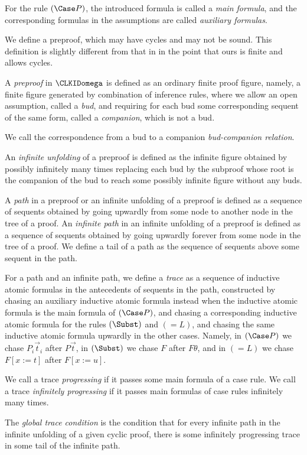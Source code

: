 For the rule $(\Case P)$,
the introduced formula 
is called a {\em main formula},
and the corresponding formulas in the assumptions are called {\em auxiliary
formulas}.

We define a preproof, which may have cycles and may not be sound.
This definition is slightly different from that in \cite{Brotherston11}
in the point that ours is finite and allows cycles.

\begin{Def}[Preproof]\rm
A {\em preproof} in $\CLKIDomega$ is defined as an ordinary finite proof figure,
namely, a finite figure generated by combination of inference rules,
where 
we allow an open assumption, called a {\em bud}, and
requiring for each bud
some corresponding sequent of the same form, called a {\em companion}, 
which is not a bud.
\end{Def}
We call the correspondence from a bud to a companion {\em bud-companion relation}.

An {\em infinite unfolding} of a preproof is defined as
the infinite figure obtained by 
possibly infinitely many times replacing each bud by
the subproof whose root is the companion of the bud 
to reach some possibly infinite figure without any buds.

\begin{Def}\rm
A {\em path} in a preproof or an infinite unfolding of a preproof
is defined as a sequence of sequents obtained by going
upwardly from some node to another node in the tree
of a proof.
An {\em infinite path} in an infinite unfolding of a preproof
is defined as a sequence of sequents obtained by going
upwardly forever from some node in the tree of a proof.
We define a tail of a path as the sequence of sequents above
some sequent in the path.

For a path and an infinite path,
we define
a {\em trace}
as
a sequence of inductive atomic formulas 
in the antecedents of sequents in the path, 
constructed by
chasing an auxiliary inductive atomic formula instead when 
the inductive atomic formula is the main formula of $(\Case P)$,
and
chasing a corresponding inductive atomic formula for
the rules $(\Subst)$ and $(=L)$,
and
chasing the same inductive atomic formula upwardly in the other cases.
Namely,
in $(\Case P)$ we chase $P_i\Vec t_i$ after $P\Vec t$,
in $(\Subst)$ we chase $F$ after $F\theta$,
and
in $(=L)$ we chase $F[x:=t]$ after $F[x:=u]$.

We call a trace {\em progressing} 
if it passes some main formula of a case rule.
We call a trace {\em infinitely progressing} 
if it passes main formulas of case rules infinitely many times.

The {\em global trace condition} \cite{Brotherston11,Brotherston-phd} is 
the condition that
for every infinite path in the infinite unfolding of a given cyclic proof,
there is some infinitely progressing trace in some tail of the infinite path.
\end{Def}


